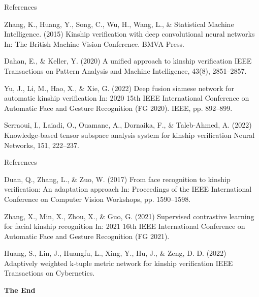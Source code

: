 \documentclass[aspectratio=169,xcolor=dvipsnames]{beamer}
\begin{document}
\begin{frame}{References}
    \footnotesize{
        \begin{thebibliography}{99}

             Zhang, K., Huang, Y., Song, C., Wu, H., Wang, L., \& Statistical Machine Intelligence. (2015)
            \newblock Kinship verification with deep convolutional neural networks
            \newblock In: The British Machine Vision Conference. BMVA Press.
            
             Dahan, E., \& Keller, Y. (2020)
            \newblock A unified approach to kinship verification
            \newblock IEEE Transactions on Pattern Analysis and Machine Intelligence, 43(8), 2851–2857.
            
             Yu, J., Li, M., Hao, X., \& Xie, G. (2022)
            \newblock Deep fusion siamese network for automatic kinship verification
            \newblock In: 2020 15th IEEE International Conference on Automatic Face and Gesture Recognition (FG 2020). IEEE, pp. 892–899.
            
             Serraoui, I., Laiadi, O., Ouamane, A., Dornaika, F., \& Taleb-Ahmed, A. (2022)
            \newblock Knowledge-based tensor subspace analysis system for kinship verification
            \newblock Neural Networks, 151, 222–237.
            
        \end{thebibliography}
    }
\end{frame}
            
\begin{frame}{References}
    \footnotesize{
        \begin{thebibliography}{99}
             Duan, Q., Zhang, L., \& Zuo, W. (2017)
            \newblock From face recognition to kinship verification: An adaptation approach
            \newblock In: Proceedings of the IEEE International Conference on Computer Vision Workshops, pp. 1590–1598.
            
             Zhang, X., Min, X., Zhou, X., \& Guo, G. (2021)
            \newblock Supervised contrastive learning for facial kinship recognition
            \newblock In: 2021 16th IEEE International Conference on Automatic Face and Gesture Recognition (FG 2021).
            
             Huang, S., Lin, J., Huangfu, L., Xing, Y., Hu, J., \& Zeng, D. D. (2022)
            \newblock Adaptively weighted k-tuple metric network for kinship verification
            \newblock IEEE Transactions on Cybernetics.

        \end{thebibliography}
    }
\end{frame}


\begin{frame}
    \Huge{\centerline{\textbf{The End}}}
\end{frame}

\end{document}
